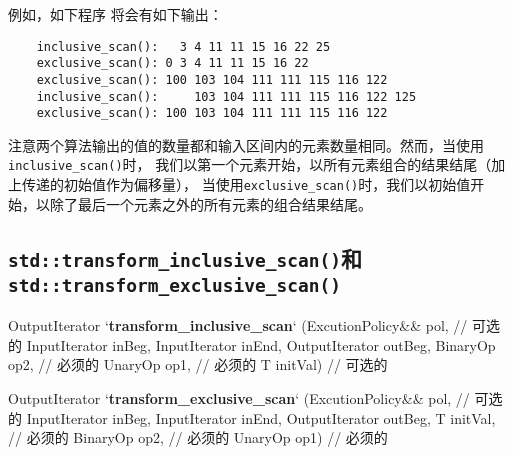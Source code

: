 例如，如下程序
将会有如下输出：
\begin{lstlisting}
    inclusive_scan():   3 4 11 11 15 16 22 25
    exclusive_scan(): 0 3 4 11 11 15 16 22
    exclusive_scan(): 100 103 104 111 111 115 116 122
    inclusive_scan():     103 104 111 111 115 116 122 125
    exclusive_scan(): 100 103 104 111 111 115 116 122
\end{lstlisting}
注意两个算法输出的值的数量都和输入区间内的元素数量相同。然而，当使用\texttt{inclusive\_scan()}时，
我们以第一个元素开始，以所有元素组合的结果结尾（加上传递的初始值作为偏移量），
当使用\texttt{exclusive\_scan()}时，我们以初始值开始，以除了最后一个元素之外的所有元素的组合结果结尾。

\subsection{\texorpdfstring{\texttt{std::transform\_inclusive\_scan()}和\\
\texttt{std::transform\_exclusive\_scan()}}{}}
\begin{blacklisting}
OutputIterator
`\textbf{transform\_inclusive\_scan}` (ExcutionPolicy&& pol,    // 可选的
                          InputIterator inBeg, InputIterator inEnd,
                          OutputIterator outBeg,
                          BinaryOp op2,         // 必须的
                          UnaryOp op1,          // 必须的
                          T initVal)            // 可选的

OutputIterator
`\textbf{transform\_exclusive\_scan}` (ExcutionPolicy&& pol,    // 可选的
                          InputIterator inBeg, InputIterator inEnd,
                          OutputIterator outBeg,
                          T initVal,            // 必须的
                          BinaryOp op2,         // 必须的
                          UnaryOp op1)          // 必须的
\end{blacklisting}
